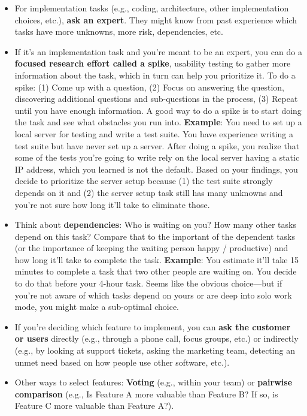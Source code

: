 \begin{itemize}
    \item For implementation tasks (e.g., coding, architecture, other implementation choices, etc.), \textbf{ask an expert}. They might know from past experience which tasks have more unknowns, more risk, dependencies, etc.\\
    \item If it's an implementation task and you're meant to be an expert, you can do a \textbf{focused research effort called a spike}\marginpar{\spikeDef\margindivider}\marginpar{\focusGroupDef\margindivider}, usability testing\marginpar{\usabilityTestingDef\margindivider}\marginpar{\estimationDef\margindivider}\marginpar{\storyPointsDef} to gather more information about the task, which in turn can help you prioritize it. To do a spike: (1) Come up with a question, (2) Focus on answering the question, discovering additional questions and sub-questions in the process, (3) Repeat until you have enough information. A good way to do a spike is to start doing the task and see what obstacles you run into. \textbf{Example}: You need to set up a local server for testing and write a test suite. You have experience writing a test suite but have never set up a server. After doing a spike, you realize that some of the tests you're going to write rely on the local server having a static IP address, which you learned is not the default. Based on your findings, you decide to prioritize the server setup because (1) the test suite strongly depends on it and (2) the server setup task still has many unknowns and you're not sure how long it'll take to eliminate those. \\
    \item Think about \textbf{dependencies}: Who is waiting on you? How many other tasks depend on this task? Compare that to the important of the dependent tasks (or the importance of keeping the waiting person happy / productive) and how long it'll take to complete the task. \textbf{Example}: You estimate it'll take 15 minutes to complete a task that two other people are waiting on. You decide to do that before your 4-hour task. Seems like the obvious choice---but if you're not aware of which tasks depend on yours or are deep into solo work mode, you might make a sub-optimal choice.\\
    \item If you're deciding which feature to implement, you can \textbf{ask the customer or users} directly (e.g., through a phone call, focus groups, etc.) or indirectly (e.g., by looking at support tickets, asking the marketing team, detecting an unmet need based on how people use other software, etc.).\\
    \item Other ways to select features: \textbf{Voting} (e.g., within your team) or \textbf{pairwise comparison} (e.g., Is Feature A more valuable than Feature B? If so, is Feature C more valuable than Feature A?).\\
\end{itemize}
